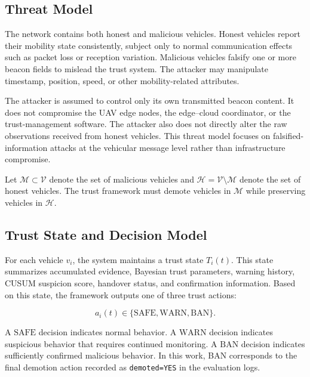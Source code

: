 \documentclass[journal]{IEEEtran}
\begin{document}
\subsection{Threat Model}
\label{subsec:threat_model}

The network contains both honest and malicious vehicles. Honest vehicles report their mobility state consistently, subject only to normal communication effects such as packet loss or reception variation. Malicious vehicles falsify one or more beacon fields to mislead the trust system. The attacker may manipulate timestamp, position, speed, or other mobility-related attributes.

The attacker is assumed to control only its own transmitted beacon content. It does not compromise the UAV edge nodes, the edge--cloud coordinator, or the trust-management software. The attacker also does not directly alter the raw observations received from honest vehicles. This threat model focuses on falsified-information attacks at the vehicular message level rather than infrastructure compromise.

Let \(\mathcal{M}\subset\mathcal{V}\) denote the set of malicious vehicles and \(\mathcal{H}=\mathcal{V}\setminus\mathcal{M}\) denote the set of honest vehicles. The trust framework must demote vehicles in \(\mathcal{M}\) while preserving vehicles in \(\mathcal{H}\).

\subsection{Trust State and Decision Model}
\label{subsec:trust_decision_model}

For each vehicle \(v_i\), the system maintains a trust state \(T_i(t)\). This state summarizes accumulated evidence, Bayesian trust parameters, warning history, CUSUM suspicion score, handover status, and confirmation information. Based on this state, the framework outputs one of three trust actions:

\begin{equation}
a_i(t) \in \{\text{SAFE}, \text{WARN}, \text{BAN}\}.
\label{eq:trust_action}
\end{equation}

A \(\text{SAFE}\) decision indicates normal behavior. A \(\text{WARN}\) decision indicates suspicious behavior that requires continued monitoring. A \(\text{BAN}\) decision indicates sufficiently confirmed malicious behavior. In this work, BAN corresponds to the final demotion action recorded as \texttt{demoted=YES} in the evaluation logs.
\end{document}
